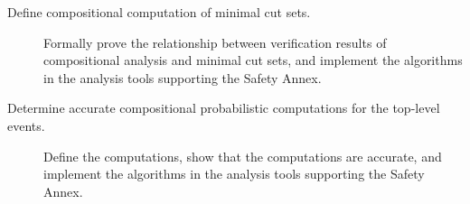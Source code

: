 \begin{description}
\item[Define compositional computation of minimal cut sets.] Formally prove the relationship between verification results of compositional analysis and minimal cut sets, and implement the algorithms in the analysis tools supporting the Safety Annex.

\item[Determine accurate compositional probabilistic computations for the top-level events.] Define the computations, show that the computations are accurate, and implement the algorithms in the analysis tools supporting the Safety Annex.


\end{description}
